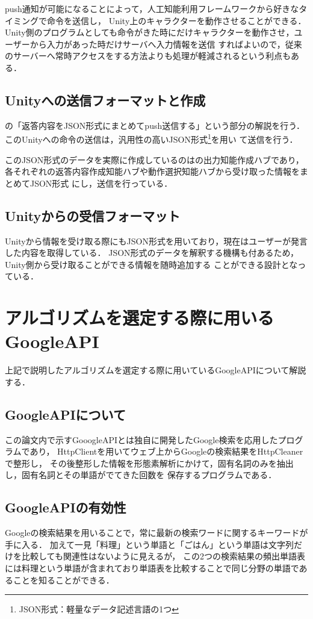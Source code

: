 push通知が可能になることによって，人工知能利用フレームワークから好きなタイミングで命令を送信し，
Unity上のキャラクターを動作させることができる．
Unity側のプログラムとしても命令がきた時にだけキャラクターを動作させ，ユーザーから入力があった時だけサーバへ入力情報を送信
すればよいので，従来のサーバーへ常時アクセスをする方法よりも処理が軽減されるという利点もある．

\subsection{Unityへの送信フォーマットと作成}
の「返答内容をJSON形式にまとめてpush送信する」という部分の解説を行う．
このUnityへの命令の送信は，汎用性の高いJSON形式\footnote{JSON形式：軽量なデータ記述言語の1つ}を用い
て送信を行う．

このJSON形式のデータを実際に作成しているのはの出力知能作成ハブであり，
各それぞれの返答内容作成知能ハブや動作選択知能ハブから受け取った情報をまとめてJSON形式
にし，送信を行っている．

\subsection{Unityからの受信フォーマット}
Unityから情報を受け取る際にもJSON形式を用いており，現在はユーザーが発言した内容を取得している．
JSON形式のデータを解釈する機構も付あるため，Unity側から受け取ることができる情報を随時追加する
ことができる設計となっている．


\section{アルゴリズムを選定する際に用いるGoogleAPI}
上記で説明したアルゴリズムを選定する際に用いているGoogleAPIについて解説する．

\subsection{GoogleAPIについて}
この論文内で示すGooogleAPIとは独自に開発したGoogle検索を応用したプログラムであり，
HttpClientを用いてウェブ上からGoogleの検索結果をHttpCleanerで整形し，
その後整形した情報を形態素解析にかけて，固有名詞のみを抽出し，固有名詞とその単語がでてきた回数を
保存するプログラムである．

\subsection{GoogleAPIの有効性}
Googleの検索結果を用いることで，常に最新の検索ワードに関するキーワードが手に入る．
加えて一見「料理」という単語と「ごはん」という単語は文字列だけを比較しても関連性はないように見えるが，
この2つの検索結果の頻出単語表には料理という単語が含まれており単語表を比較することで同じ分野の単語であることを知ることができる．

